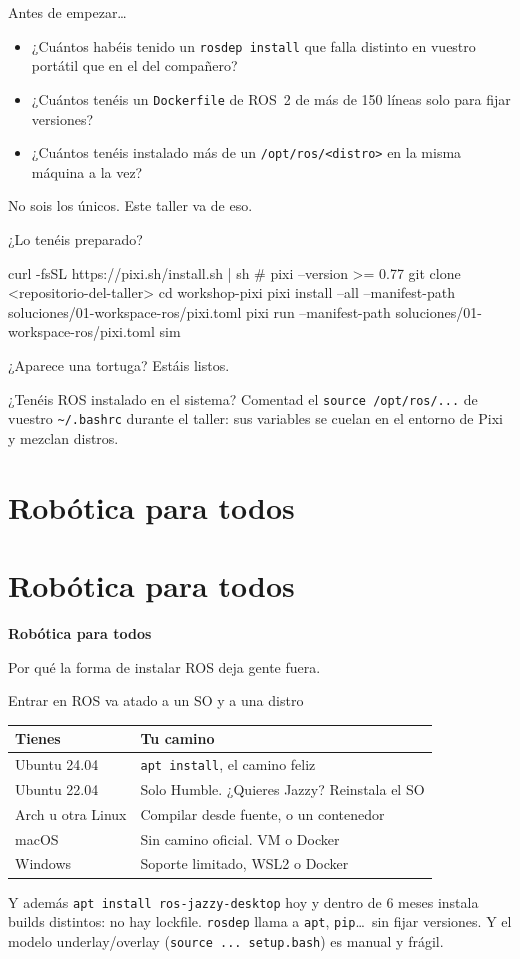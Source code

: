 \documentclass[aspectratio=169]{beamer}
\newcommand{\separador}[2]{%
\begin{frame}
  \centering
  \vfill
  {\usebeamercolor[fg]{structure}\fontsize{34}{40}\selectfont\bfseries #1\par}
  \vspace{1.2em}
  {\Large\color{halfgray} #2\par}
  \vfill
\end{frame}%
}
\newcommand{\seccion}[3][]{%
  \if\relax\detokenize{#1}\relax\section{#2}\else\section[#1]{#2}\fi
  \separador{#2}{#3}%
}
\begin{document}
\begin{frame}{Antes de empezar\ldots}
\begin{itemize}
    \item ¿Cuántos habéis tenido un \lstinline|rosdep install| que falla distinto en vuestro portátil que en el del compañero?
    \item ¿Cuántos tenéis un \texttt{Dockerfile} de ROS~2 de más de 150 líneas solo para fijar versiones?
    \item ¿Cuántos tenéis instalado más de un \lstinline|/opt/ros/<distro>| en la misma máquina a la vez?
\end{itemize}
\vfill
\begin{block}{}
\centering No sois los únicos. Este taller va de eso.
\end{block}
\end{frame}

\begin{frame}[fragile]{¿Lo tenéis preparado?}
\begin{terminal}
curl -fsSL https://pixi.sh/install.sh | sh     # pixi --version >= 0.77
git clone <repositorio-del-taller>
cd workshop-pixi
pixi install --all --manifest-path soluciones/01-workspace-ros/pixi.toml
pixi run --manifest-path soluciones/01-workspace-ros/pixi.toml sim
\end{terminal}
\vfill
\centering ¿Aparece una tortuga? Estáis listos.
\vfill
\begin{alertblock}{¿Tenéis ROS instalado en el sistema?}
Comentad el \lstinline|source /opt/ros/...| de vuestro \lstinline|~/.bashrc| durante el taller: sus variables se cuelan en el entorno de Pixi y mezclan distros.
\end{alertblock}
\end{frame}

\seccion{Robótica para todos}{Por qué la forma de instalar ROS deja gente fuera.}

\begin{frame}{Entrar en ROS va atado a un SO y a una distro}
\centering
\begin{tabular}{ll}
\toprule
\textbf{Tienes} & \textbf{Tu camino} \\
\midrule
Ubuntu 24.04 & \lstinline|apt install|, el camino feliz \\
Ubuntu 22.04 & Solo Humble. ¿Quieres Jazzy? Reinstala el SO \\
Arch u otra Linux & Compilar desde fuente, o un contenedor \\
macOS & Sin camino oficial. VM o Docker \\
Windows & Soporte limitado, WSL2 o Docker \\
\bottomrule
\end{tabular}
\vfill
\begin{block}{Y además}
\lstinline|apt install ros-jazzy-desktop| hoy y dentro de 6 meses instala builds distintos: no hay lockfile. \texttt{rosdep} llama a \texttt{apt}, \texttt{pip}\ldots\ sin fijar versiones. Y el modelo underlay/overlay (\lstinline|source ... setup.bash|) es manual y frágil.
\end{block}
\end{frame}
\end{document}
